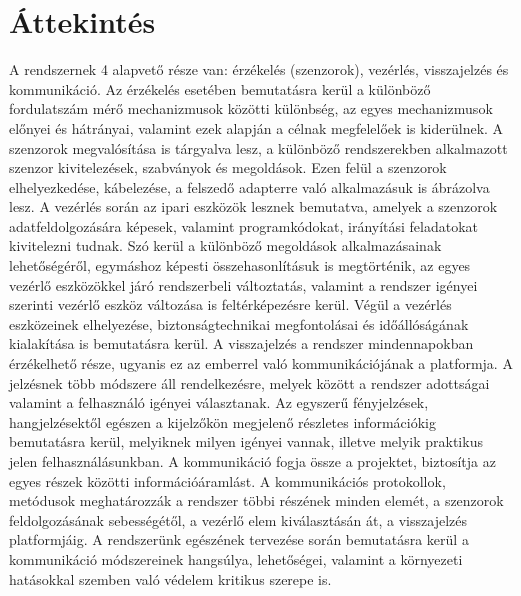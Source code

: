 \section{Áttekintés}

A rendszernek 4 alapvető része van: érzékelés (szenzorok), vezérlés, visszajelzés és kommunikáció.
Az érzékelés esetében bemutatásra kerül a különböző fordulatszám mérő mechanizmusok közötti különbség, az egyes mechanizmusok előnyei és hátrányai, valamint ezek alapján a célnak megfelelőek is kiderülnek. A szenzorok megvalósítása is tárgyalva lesz, a különböző rendszerekben alkalmazott szenzor kivitelezések, szabványok és megoldások. Ezen felül a szenzorok elhelyezkedése, kábelezése, a felszedő adapterre való alkalmazásuk is ábrázolva lesz.
A vezérlés során az ipari eszközök lesznek bemutatva, amelyek a szenzorok adatfeldolgozására képesek, valamint programkódokat, irányítási feladatokat kivitelezni tudnak. Szó kerül a különböző megoldások alkalmazásainak lehetőségéről, egymáshoz képesti összehasonlításuk is megtörténik, az egyes vezérlő eszközökkel járó rendszerbeli változtatás, valamint a rendszer igényei szerinti vezérlő eszköz változása is feltérképezésre kerül. Végül a vezérlés eszközeinek elhelyezése, biztonságtechnikai megfontolásai és időállóságának kialakítása is bemutatásra kerül.
A visszajelzés a rendszer mindennapokban érzékelhető része, ugyanis ez az emberrel való kommunikációjának a platformja. A jelzésnek több módszere áll rendelkezésre, melyek között a rendszer adottságai valamint a felhasználó igényei választanak. Az egyszerű fényjelzések, hangjelzésektől egészen a kijelzőkön megjelenő részletes információkig bemutatásra kerül, melyiknek milyen igényei vannak, illetve melyik praktikus jelen felhasználásunkban.
A kommunikáció fogja össze a projektet, biztosítja az egyes részek közötti információáramlást. A kommunikációs protokollok, metódusok meghatározzák a rendszer többi részének minden elemét, a szenzorok feldolgozásának sebességétől, a vezérlő elem kiválasztásán át, a visszajelzés platformjáig. A rendszerünk egészének tervezése során bemutatásra kerül a kommunikáció módszereinek hangsúlya, lehetőségei, valamint a környezeti hatásokkal szemben való védelem kritikus szerepe is.
